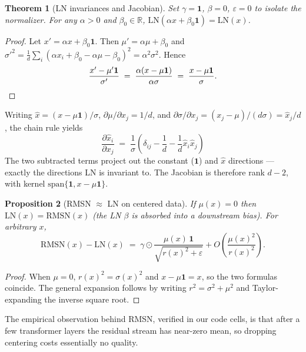 \documentclass[11pt]{article}
\newtheorem{theorem}{Theorem}[section]
\newtheorem{proposition}[theorem]{Proposition}
\theoremstyle{remark}
\begin{document}
\begin{theorem}[LN invariances and Jacobian]
\label{thm:ln}
Set $\gamma = \mathbf 1$, $\beta = 0$, $\varepsilon = 0$ to isolate the normalizer. For any $\alpha > 0$ and $\beta_0 \in \mathbb{R}$, $\mathrm{LN}(\alpha x + \beta_0 \mathbf{1}) = \mathrm{LN}(x)$.
\end{theorem}

\begin{proof}
Let $x' = \alpha x + \beta_0 \mathbf{1}$. Then $\mu' = \alpha \mu + \beta_0$ and $\sigma'^2 = \tfrac1d \sum_i (\alpha x_i + \beta_0 - \alpha \mu - \beta_0)^2 = \alpha^2 \sigma^2$. Hence
\[
  \frac{x' - \mu' \mathbf{1}}{\sigma'} \;=\; \frac{\alpha (x - \mu \mathbf{1})}{\alpha \sigma} \;=\; \frac{x - \mu \mathbf{1}}{\sigma}. \qedhere
\]
\end{proof}

Writing $\hat x = (x - \mu \mathbf{1})/\sigma$, $\partial \mu/\partial x_j = 1/d$, and $\partial \sigma / \partial x_j = (x_j - \mu)/(d \sigma) = \hat x_j / d$, the chain rule yields
\[
  \boxed{\;\frac{\partial \hat x_i}{\partial x_j} \;=\; \frac{1}{\sigma}\!\left(\delta_{ij} - \frac{1}{d} - \frac{1}{d}\hat x_i \hat x_j\right)\;}
\]
The two subtracted terms project out the constant ($\mathbf 1$) and $\hat x$ directions --- exactly the directions LN is invariant to. The Jacobian is therefore rank $d - 2$, with kernel $\mathrm{span}\{\mathbf{1}, x - \mu \mathbf{1}\}$.

\begin{proposition}[RMSN $\approx$ LN on centered data]
If $\mu(x) = 0$ then $\mathrm{LN}(x) = \mathrm{RMSN}(x)$ (the LN $\beta$ is absorbed into a downstream bias). For arbitrary $x$,
\[
  \mathrm{RMSN}(x) - \mathrm{LN}(x) \;=\; \gamma \odot \frac{\mu(x)\,\mathbf 1}{\sqrt{r(x)^2 + \varepsilon}} + O\!\left(\frac{\mu(x)^2}{r(x)^2}\right).
\]
\end{proposition}

\begin{proof}
When $\mu = 0$, $r(x)^2 = \sigma(x)^2$ and $x - \mu \mathbf{1} = x$, so the two formulas coincide. The general expansion follows by writing $r^2 = \sigma^2 + \mu^2$ and Taylor-expanding the inverse square root.
\end{proof}

The empirical observation behind RMSN, verified in our code cells, is that after a few transformer layers the residual stream has near-zero mean, so dropping centering costs essentially no quality.
\end{document}
